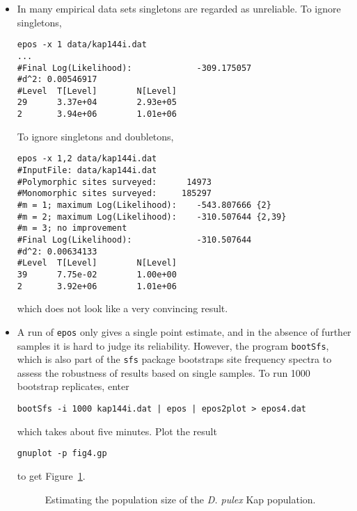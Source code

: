 \documentclass[a4paper, english]{article}
\newcommand{\ty}{\texttt}
\begin{document}
\begin{itemize}
\begin{verbatim}
#Level  T[Level]        N[Level]
26      4.97e+04        3.76e+05
24      8.78e+04        2.74e+06
6       4.40e+05        5.63e+05
4       2.64e+06        4.12e+06
2       3.05e+06        1.55e+05
\end{verbatim}
which is very similar to the result with the log-likelihood threshold.
\item In many empirical data sets singletons are regarded as
  unreliable. To ignore singletons,
\begin{verbatim}
epos -x 1 data/kap144i.dat 
...
#Final Log(Likelihood):             -309.175057
#d^2: 0.00546917
#Level  T[Level]        N[Level]
29      3.37e+04        2.93e+05
2       3.94e+06        1.01e+06
\end{verbatim}
To ignore singletons and doubletons,
\begin{verbatim}
epos -x 1,2 data/kap144i.dat 
#InputFile: data/kap144i.dat
#Polymorphic sites surveyed:      14973
#Monomorphic sites surveyed:     185297
#m = 1; maximum Log(Likelihood):    -543.807666 {2}
#m = 2; maximum Log(Likelihood):    -310.507644 {2,39}
#m = 3; no improvement
#Final Log(Likelihood):             -310.507644
#d^2: 0.00634133
#Level  T[Level]        N[Level]
39      7.75e-02        1.00e+00
2       3.92e+06        1.01e+06
\end{verbatim}
which does not look like a very convincing result.
\item A run of \ty{epos} only gives a single point estimate,
  and in the absence of further samples it is hard to judge its
  reliability. However, the program \ty{bootSfs}, which is also part
  of the \ty{sfs} package bootstraps site frequency spectra to assess the
  robustness of results based on single samples. To run 1000 bootstrap
  replicates, enter
\begin{verbatim}
bootSfs -i 1000 kap144i.dat | epos | epos2plot > epos4.dat
\end{verbatim}
which takes about five minutes. Plot the result
\begin{verbatim}
gnuplot -p fig4.gp
\end{verbatim}
to get Figure~\ref{fig:kap}.
\begin{figure}
  \begin{center}
    \scalebox{0.6}{}
  \end{center}
  \caption{Estimating the population size of the \textit{D. pulex} Kap
    population.}\label{fig:kap}
\end{figure}
\end{itemize}
\end{document}
